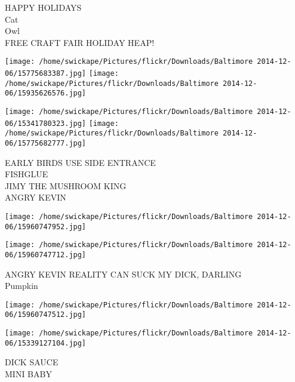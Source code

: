 \documentclass[10pt,letterpaper]{article}
\begin{document}
HAPPY HOLIDAYS\\
Cat\\
Owl\\
FREE CRAFT FAIR HOLIDAY HEAP!\\
\pagebreak

\texttt{[image: /home/swickape/Pictures/flickr/Downloads/Baltimore 2014-12-06/15775683387.jpg]}
\texttt{[image: /home/swickape/Pictures/flickr/Downloads/Baltimore 2014-12-06/15935626576.jpg]}

\texttt{[image: /home/swickape/Pictures/flickr/Downloads/Baltimore 2014-12-06/15341780323.jpg]}
\texttt{[image: /home/swickape/Pictures/flickr/Downloads/Baltimore 2014-12-06/15775682777.jpg]}

EARLY BIRDS USE SIDE ENTRANCE\\
FISHGLUE\\
JIMY THE MUSHROOM KING\\
ANGRY KEVIN\\
\pagebreak

\texttt{[image: /home/swickape/Pictures/flickr/Downloads/Baltimore 2014-12-06/15960747952.jpg]}

\vspace{0.25in}
\texttt{[image: /home/swickape/Pictures/flickr/Downloads/Baltimore 2014-12-06/15960747712.jpg]}

ANGRY KEVIN REALITY CAN SUCK MY DICK, DARLING\\
Pumpkin\\
\pagebreak

\texttt{[image: /home/swickape/Pictures/flickr/Downloads/Baltimore 2014-12-06/15960747512.jpg]}

\vspace{0.25in}
\texttt{[image: /home/swickape/Pictures/flickr/Downloads/Baltimore 2014-12-06/15339127104.jpg]}

DICK SAUCE\\
MINI BABY\\
\pagebreak
\end{document}
